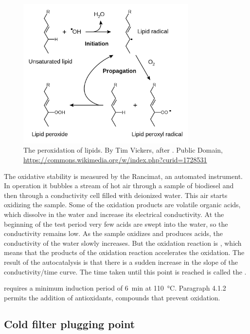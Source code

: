 \begin{figure}
\centering
\includegraphics[width=0.8\textwidth]{Figures/1281px-Lipid_peroxidation.png}
\decoRule

\caption[The peroxidation of lipids.]{The peroxidation of lipids. By Tim
Vickers, after \autocite{Young2001}. Public Domain,
\url{https://commons.wikimedia.org/w/index.php?curid=1728531}}

\label{fig:RancidRadical}
\end{figure}

The oxidative stability is measured by the Rancimat, an automated instrument. In
operation it bubbles a stream of hot air through a sample of biodiesel and then
through a conductivity cell filled with deionized water. This air starts
oxidizing the sample. Some of the oxidation products are volatile organic acids,
which dissolve in the water and increase its electrical conductivity. At the
beginning of the test period very few acids are swept into the water, so the
conductivity remains low. As the sample oxidizes and produces acids, the
conductivity of the water slowly increases. But the oxidation reaction is
, which means that the products of the oxidation reaction
accelerates the oxidation. The result of the autocatalysis is that there is a
sudden increase in the slope of the conductivity/time curve. The time taken
until this point is reached is called the .

 requires a minimum induction period of \SI{6}{\minute} at
\SI{110}{\celsius}. Paragraph 4.1.2 permits the addition of antioxidants,
compounds that prevent oxidation.

\subsection{Cold filter plugging point}
\label{sec:CFPP}

